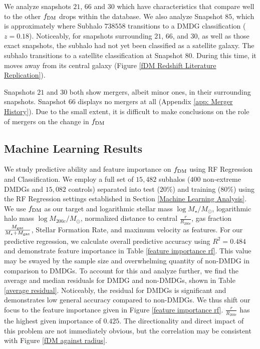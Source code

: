 \documentclass[twocolumn]{openjournal}
\begin{document}
We analyze snapshots $21$, $66$ and $30$ which have characteristics that compare well to the other $f_\textup{DM}$ drops within the database. We also analyze Snapshot $85$, which is approximately where Subhalo $738558$ transitions to a DMDG classification ($z=0.18$). Noticeably, for snapshots surrounding $21$, $66$, and $30$, as well as those exact snapshots, the subhalo had not yet been classified as a satellite galaxy. The subhalo transitions to a satellite classification at Snapshot $80$. During this time, it moves away from its central galaxy (Figure \ref{fDM Redshift Literature Replication}).

Snapshots $21$ and $30$ both show mergers, albeit minor ones, in their surrounding snapshots. Snapshot $66$ displays no mergers at all (Appendix \ref{app: Merger History}). Due to the small extent, it is difficult to make conclusions on the role of mergers on the change in $f_\textup{DM}$ 
\subsection{Machine Learning Results} \label{Machine Learning Results}
We study predictive ability and feature importance on $f_\textup{DM}$ using RF Regression and Classification. We employ a full set of $15,482$ subhalos ($400$ non-extreme DMDGs and $15,082$ controls) separated into test ($20\%$) and training ($80\%$) using the RF Regression settings established in Section \ref{Machine Learning Analysis}. We use $f_\textup{DM}$ as our target and logarithmic stellar mass $\log M_\star/M_\odot$, logarithmic halo mass $\log M_{200c}/M_\odot$, normalized distance to central $\frac{r}{R_{200c}}$, gas fraction $\frac{M_\textup{gas}}{M_\star + M_\textup{gas}}$, Stellar Formation Rate, and maximum velocity as features. For our predictive regression, we calculate overall predictive accuracy using $R^2=0.484$ and demonstrate feature importance in Table \ref{feature importance rf}. This value may be swayed by the sample size and overwhelming quantity of non-DMDG in comparison to DMDGs. To account for this and analyze further, we find the average and median residuals for DMDG and non-DMDGs, shown in Table \ref{average residual}. Noticeably, the residual for DMDGs is significant and demonstrates low general accuracy compared to non-DMDGs. We thus shift our focus to the feature importance given in Figure  \ref{feature importance rf}. $\frac{r}{R_{200c}}$ has the highest given importance of $0.425$. The directionality and direct impact of this problem are not immediately obvious, but the correlation may be consistent with Figure \ref{fDM against radius}. 
\end{document}
